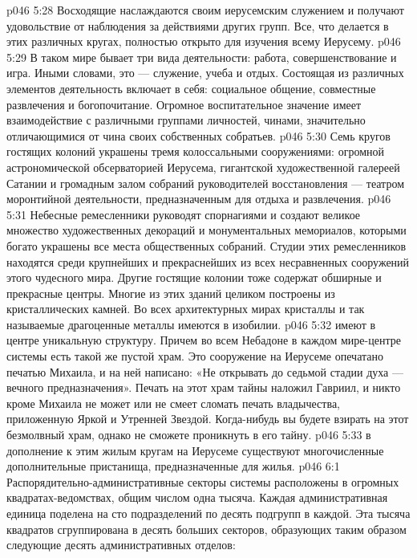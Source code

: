 \vs p046 5:28 Восходящие наслаждаются своим иерусемским служением и получают удовольствие от наблюдения за действиями других групп. Все, что делается в этих различных кругах, полностью открыто для изучения всему Иерусему.
\vs p046 5:29 В таком мире бывает три вида деятельности: работа, совершенствование и игра. Иными словами, это --- служение, учеба и отдых. Состоящая из различных элементов деятельность включает в себя: социальное общение, совместные развлечения и богопочитание. Огромное воспитательное значение имеет взаимодействие с различными группами личностей, чинами, значительно отличающимися от чина своих собственных собратьев.
\vs p046 5:30 \pc {}\bibnobreakspace {} Семь кругов гостящих колоний украшены тремя колоссальными сооружениями: огромной астрономической обсерваторией Иерусема, гигантской художественной галереей Сатании и громадным залом собраний руководителей восстановления --- театром моронтийной деятельности, предназначенным для отдыха и развлечения.
\vs p046 5:31 Небесные ремесленники руководят спорнагиями и создают великое множество художественных декораций и монументальных мемориалов, которыми богато украшены все места общественных собраний. Студии этих ремесленников находятся среди крупнейших и прекраснейших из всех несравненных сооружений этого чудесного мира. Другие гостящие колонии тоже содержат обширные и прекрасные центры. Многие из этих зданий целиком построены из кристаллических камней. Во всех архитектурных мирах кристаллы и так называемые драгоценные металлы имеются в изобилии.
\vs p046 5:32 \pc {}\bibnobreakspace {} имеют в центре уникальную структуру. Причем во всем Небадоне в каждом мире\hyp{}центре системы есть такой же пустой храм. Это сооружение на Иерусеме опечатано печатью Михаила, и на ней написано: «Не открывать до седьмой стадии духа --- вечного предназначения». Печать на этот храм тайны наложил Гавриил, и никто кроме Михаила не может или не смеет сломать печать владычества, приложенную Яркой и Утренней Звездой. Когда\hyp{}нибудь вы будете взирать на этот безмолвный храм, однако не сможете проникнуть в его тайну.
\vs p046 5:33 \pc {} в дополнение к этим жилым кругам на Иерусеме существуют многочисленные дополнительные пристанища, предназначенные для жилья.
\vs p046 6:1 Распорядительно\hyp{}административные секторы системы расположены в огромных квадратах\hyp{}ведомствах, общим числом одна тысяча. Каждая административная единица поделена на сто подразделений по десять подгрупп в каждой. Эта тысяча квадратов сгруппирована в десять больших секторов, образующих таким образом следующие десять административных отделов:
